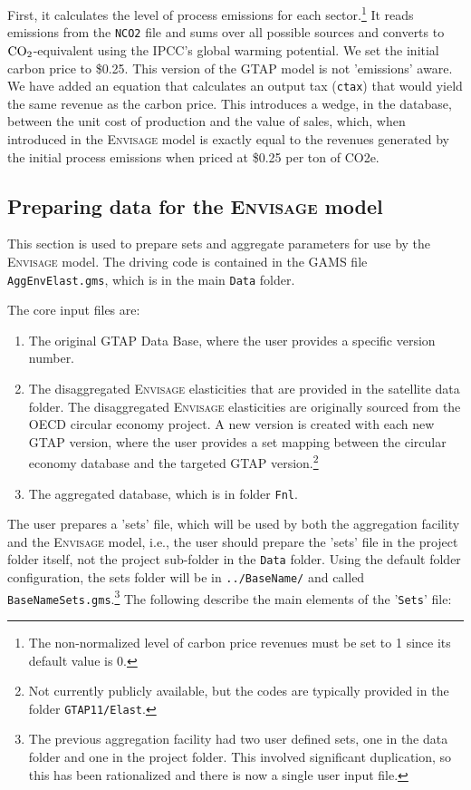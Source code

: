 \noindent First, it calculates the level of process emissions for each sector.\footnote{The
non-normalized level of carbon price revenues must be set to 1 since its default value is 0.}
It
reads emissions from the \texttt{NCO2} file and sums over all possible
sources and converts to $\textnormal{CO}_2$-equivalent using the IPCC's
global warming potential. We set the initial carbon price to \$0.25. This version of the GTAP model
is not 'emissions' aware. We have added an equation that calculates an output tax
(\texttt{ctax}) that would yield the same revenue as the carbon price. This introduces
a wedge, in the database, between the unit cost of production and the value of sales, which,
when introduced in the \textsc{Envisage} model is exactly equal to the revenues
generated by the initial process emissions when priced at \$0.25 per ton of
CO2e.

\subsection{Preparing data for the \textsc{Envisage} model}

This section is used to prepare sets and aggregate parameters for
use by the \textsc{Envisage} model. The driving code is
contained in the GAMS file \texttt{AggEnvElast.gms}, which
is in the main \texttt{Data} folder.

The core input files are:

\begin{enumerate}
\item The original GTAP Data Base, where the user provides a specific version number.
\item The disaggregated \textsc{Envisage} elasticities that are provided in the
satellite data folder. The disaggregated \textsc{Envisage} elasticities
are originally sourced from the OECD circular economy project. A new
version is created with each new GTAP version, where the user provides
a set mapping between the circular economy database and the targeted
GTAP version.\footnote{Not currently publicly available, but the
codes are typically provided in the folder \texttt{GTAP11/Elast}.}
\item The aggregated database, which is in folder \texttt{Fnl}.
\end{enumerate}

The user prepares a 'sets' file, which will be used by both the
aggregation facility and the \textsc{Envisage} model, i.e., the
user should prepare the 'sets' file in the project folder itself,
not the project sub-folder in the \texttt{Data} folder. Using
the default folder configuration, the sets folder will be in
\texttt{../BaseName/} and called \texttt{BaseNameSets.gms}.\footnote{The
previous aggregation facility had two user defined sets, one in the
data folder and one in the project folder. This involved significant
duplication, so this has been rationalized and there is now a single
user input file.} The following describe the main elements
of the '\texttt{Sets}' file:

